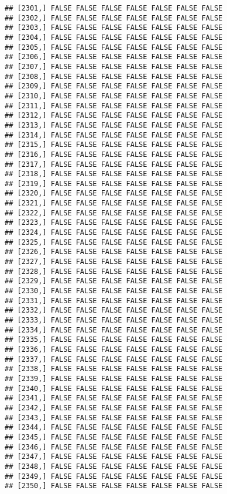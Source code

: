 \documentclass[
]{article}
\begin{document}
\begin{verbatim}
## [2301,] FALSE FALSE FALSE FALSE FALSE FALSE FALSE
## [2302,] FALSE FALSE FALSE FALSE FALSE FALSE FALSE
## [2303,] FALSE FALSE FALSE FALSE FALSE FALSE FALSE
## [2304,] FALSE FALSE FALSE FALSE FALSE FALSE FALSE
## [2305,] FALSE FALSE FALSE FALSE FALSE FALSE FALSE
## [2306,] FALSE FALSE FALSE FALSE FALSE FALSE FALSE
## [2307,] FALSE FALSE FALSE FALSE FALSE FALSE FALSE
## [2308,] FALSE FALSE FALSE FALSE FALSE FALSE FALSE
## [2309,] FALSE FALSE FALSE FALSE FALSE FALSE FALSE
## [2310,] FALSE FALSE FALSE FALSE FALSE FALSE FALSE
## [2311,] FALSE FALSE FALSE FALSE FALSE FALSE FALSE
## [2312,] FALSE FALSE FALSE FALSE FALSE FALSE FALSE
## [2313,] FALSE FALSE FALSE FALSE FALSE FALSE FALSE
## [2314,] FALSE FALSE FALSE FALSE FALSE FALSE FALSE
## [2315,] FALSE FALSE FALSE FALSE FALSE FALSE FALSE
## [2316,] FALSE FALSE FALSE FALSE FALSE FALSE FALSE
## [2317,] FALSE FALSE FALSE FALSE FALSE FALSE FALSE
## [2318,] FALSE FALSE FALSE FALSE FALSE FALSE FALSE
## [2319,] FALSE FALSE FALSE FALSE FALSE FALSE FALSE
## [2320,] FALSE FALSE FALSE FALSE FALSE FALSE FALSE
## [2321,] FALSE FALSE FALSE FALSE FALSE FALSE FALSE
## [2322,] FALSE FALSE FALSE FALSE FALSE FALSE FALSE
## [2323,] FALSE FALSE FALSE FALSE FALSE FALSE FALSE
## [2324,] FALSE FALSE FALSE FALSE FALSE FALSE FALSE
## [2325,] FALSE FALSE FALSE FALSE FALSE FALSE FALSE
## [2326,] FALSE FALSE FALSE FALSE FALSE FALSE FALSE
## [2327,] FALSE FALSE FALSE FALSE FALSE FALSE FALSE
## [2328,] FALSE FALSE FALSE FALSE FALSE FALSE FALSE
## [2329,] FALSE FALSE FALSE FALSE FALSE FALSE FALSE
## [2330,] FALSE FALSE FALSE FALSE FALSE FALSE FALSE
## [2331,] FALSE FALSE FALSE FALSE FALSE FALSE FALSE
## [2332,] FALSE FALSE FALSE FALSE FALSE FALSE FALSE
## [2333,] FALSE FALSE FALSE FALSE FALSE FALSE FALSE
## [2334,] FALSE FALSE FALSE FALSE FALSE FALSE FALSE
## [2335,] FALSE FALSE FALSE FALSE FALSE FALSE FALSE
## [2336,] FALSE FALSE FALSE FALSE FALSE FALSE FALSE
## [2337,] FALSE FALSE FALSE FALSE FALSE FALSE FALSE
## [2338,] FALSE FALSE FALSE FALSE FALSE FALSE FALSE
## [2339,] FALSE FALSE FALSE FALSE FALSE FALSE FALSE
## [2340,] FALSE FALSE FALSE FALSE FALSE FALSE FALSE
## [2341,] FALSE FALSE FALSE FALSE FALSE FALSE FALSE
## [2342,] FALSE FALSE FALSE FALSE FALSE FALSE FALSE
## [2343,] FALSE FALSE FALSE FALSE FALSE FALSE FALSE
## [2344,] FALSE FALSE FALSE FALSE FALSE FALSE FALSE
## [2345,] FALSE FALSE FALSE FALSE FALSE FALSE FALSE
## [2346,] FALSE FALSE FALSE FALSE FALSE FALSE FALSE
## [2347,] FALSE FALSE FALSE FALSE FALSE FALSE FALSE
## [2348,] FALSE FALSE FALSE FALSE FALSE FALSE FALSE
## [2349,] FALSE FALSE FALSE FALSE FALSE FALSE FALSE
## [2350,] FALSE FALSE FALSE FALSE FALSE FALSE FALSE

\end{verbatim}
\end{document}
